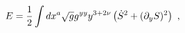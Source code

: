 \begin{equation}
E= {1 \over 2}\int dx^a \sqrt{g} g^{yy} y^{3+2\nu} 
\left( \dot{S}^2
+(\partial_y S)^2 \right)
\ ,
\label{energyb}
\end{equation}

